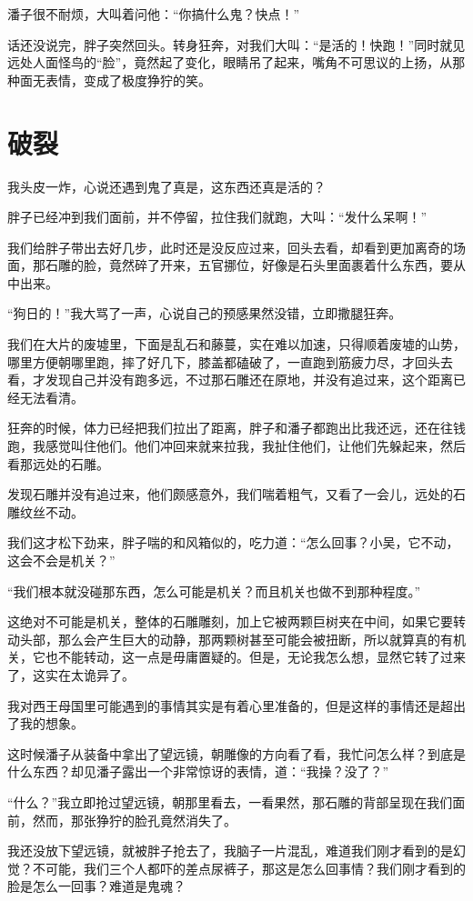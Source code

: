 潘子很不耐烦，大叫着问他：“你搞什么鬼？快点！”

话还没说完，胖子突然回头。转身狂奔，对我们大叫：“是活的！快跑！”同时就见远处人面怪鸟的“脸”，竟然起了变化，眼睛吊了起来，嘴角不可思议的上扬，从那种面无表情，变成了极度狰狞的笑。

\chapter{破裂}

我头皮一炸，心说还遇到鬼了真是，这东西还真是活的？

胖子已经冲到我们面前，并不停留，拉住我们就跑，大叫：“发什么呆啊！”

我们给胖子带出去好几步，此时还是没反应过来，回头去看，却看到更加离奇的场面，那石雕的脸，竟然碎了开来，五官挪位，好像是石头里面裹着什么东西，要从中出来。

“狗日的！”我大骂了一声，心说自己的预感果然没错，立即撒腿狂奔。

我们在大片的废墟里，下面是乱石和藤蔓，实在难以加速，只得顺着废墟的山势，哪里方便朝哪里跑，摔了好几下，膝盖都磕破了，一直跑到筋疲力尽，才回头去看，才发现自己并没有跑多远，不过那石雕还在原地，并没有追过来，这个距离已经无法看清。

狂奔的时候，体力已经把我们拉出了距离，胖子和潘子都跑出比我还远，还在往钱跑，我感觉叫住他们。他们冲回来就来拉我，我扯住他们，让他们先躲起来，然后看那远处的石雕。

发现石雕并没有追过来，他们颇感意外，我们喘着粗气，又看了一会儿，远处的石雕纹丝不动。

我们这才松下劲来，胖子喘的和风箱似的，吃力道：“怎么回事？小吴，它不动，这会不会是机关？”

“我们根本就没碰那东西，怎么可能是机关？而且机关也做不到那种程度。”

这绝对不可能是机关，整体的石雕雕刻，加上它被两颗巨树夹在中间，如果它要转动头部，那么会产生巨大的动静，那两颗树甚至可能会被扭断，所以就算真的有机关，它也不能转动，这一点是毋庸置疑的。但是，无论我怎么想，显然它转了过来了，这实在太诡异了。

我对西王母国里可能遇到的事情其实是有着心里准备的，但是这样的事情还是超出了我的想象。

这时候潘子从装备中拿出了望远镜，朝雕像的方向看了看，我忙问怎么样？到底是什么东西？却见潘子露出一个非常惊讶的表情，道：“我操？没了？”

“什么？”我立即抢过望远镜，朝那里看去，一看果然，那石雕的背部呈现在我们面前，然而，那张狰狞的脸孔竟然消失了。

我还没放下望远镜，就被胖子抢去了，我脑子一片混乱，难道我们刚才看到的是幻觉？不可能，我们三个人都吓的差点尿裤子，那这是怎么回事情？我们刚才看到的脸是怎么一回事？难道是鬼魂？

